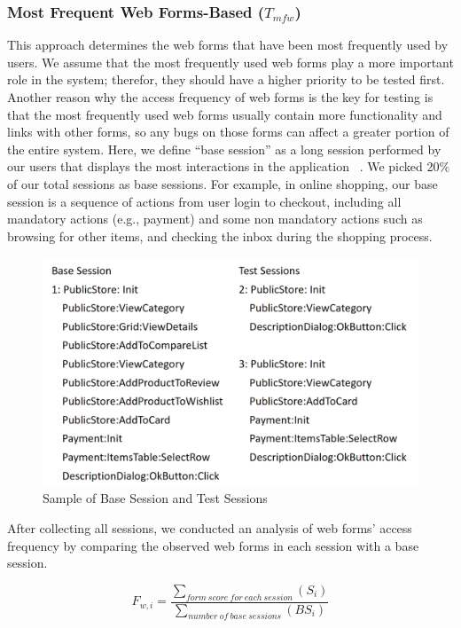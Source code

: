\subsubsection*{Most Frequent Web Forms-Based ($T_{mfw}$)}
This approach determines the web forms that have been most frequently used by users. 
We assume that the most frequently used web forms play a more important role in the system; 
therefor, they should have a higher priority to be tested first. Another reason
why the access frequency of web forms is the key for testing is that the most frequently 
used web forms usually contain more functionality and links with other forms, 
so any bugs on those forms can affect a greater portion of the entire system. 
Here, we define ``base session'' as a long session performed by our users 
that displays the most interactions in the application ~\cite{jeff16}.
We picked 20\% of our total sessions as base sessions. 
For example, in online shopping, our base session is a sequence of actions
from user login to checkout, including all mandatory actions (e.g., payment) and some 
non mandatory actions such as browsing for other items, 
and checking the inbox during the shopping process.
	
\begin{figure}[!ht]
\vspace*{-3pt}
	\centering
	\includegraphics[width=0.90\linewidth]{./SessionSample4.png}
	\caption{Sample of Base Session and Test Sessions}
	\label{fig:sessions}
\end{figure}
	
After collecting all sessions, we conducted an analysis of web forms' access frequency 
by comparing the observed web forms in each session with a base session. 
	
\vspace*{-3pt}
\[
{F_{w,i} = \frac {\sum_{{form\: score\: for \: each\: session}}(S_{i})}
	{\sum_{{number \: of \: base \: sessions}}({BS_{i}})}}	
\]
	
